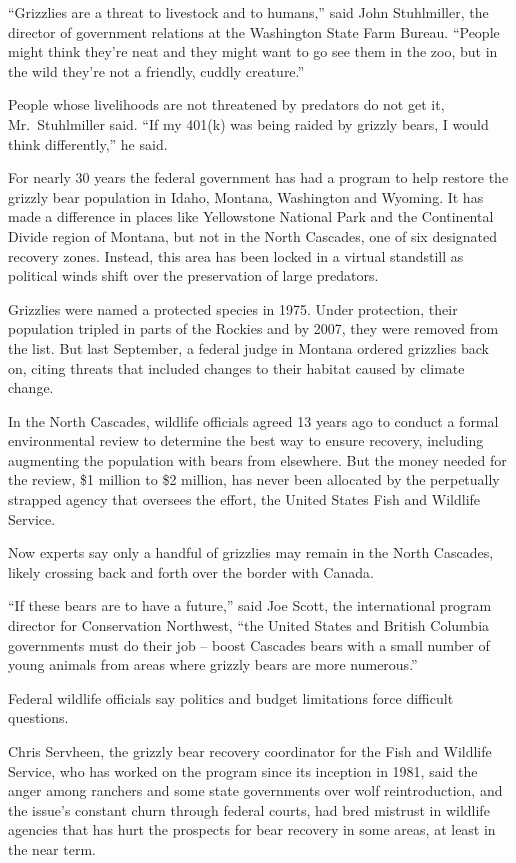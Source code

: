 ﻿\documentclass[12pt]{article}
\begin{document}
``Grizzlies are a threat to livestock and to humans,'' said John Stuhlmiller, the director of
government relations at the Washington State Farm Bureau. ``People might think they're neat and they
might want to go see them in the zoo, but in the wild they're not a friendly, cuddly creature.''

People whose livelihoods are not threatened by predators do not get it, Mr.~Stuhlmiller said. ``If
my 401(k) was being raided by grizzly bears, I would think differently,'' he said.

For nearly 30 years the federal government has had a program to help restore the grizzly bear
population in Idaho, Montana, Washington and Wyoming. It has made a difference in places like
Yellowstone National Park and the Continental Divide region of Montana, but not in the North
Cascades, one of six designated recovery zones. Instead, this area has been locked in a virtual
standstill as political winds shift over the preservation of large predators.

Grizzlies were named a protected species in 1975. Under protection, their population tripled in
parts of the Rockies and by 2007, they were removed from the list. But last September, a federal
judge in Montana ordered grizzlies back on, citing threats that included changes to their habitat
caused by climate change.

In the North Cascades, wildlife officials agreed 13 years ago to conduct a formal environmental
review to determine the best way to ensure recovery, including augmenting the population with bears
from elsewhere. But the money needed for the review, \$1 million to \$2 million, has never been
allocated by the perpetually strapped agency that oversees the effort, the United States Fish and
Wildlife Service.

Now experts say only a handful of grizzlies may remain in the North Cascades, likely crossing back
and forth over the border with Canada.

``If these bears are to have a future,'' said Joe Scott, the international program director for
Conservation Northwest, ``the United States and British Columbia governments must do their job --
boost Cascades bears with a small number of young animals from areas where grizzly bears are more
numerous.''

Federal wildlife officials say politics and budget limitations force difficult questions.

Chris Servheen, the grizzly bear recovery coordinator for the Fish and Wildlife Service, who has
worked on the program since its inception in 1981, said the anger among ranchers and some state
governments over wolf reintroduction, and the issue's constant churn through federal courts, had
bred mistrust in wildlife agencies that has hurt the prospects for bear recovery in some areas, at
least in the near term.
\end{document}
